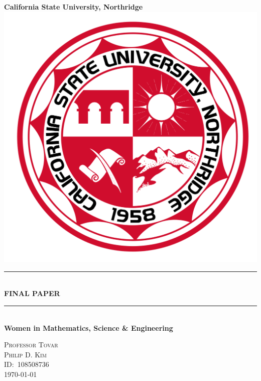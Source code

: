 \begin{titlepage}
  \newcommand{\HRule}{\rule{\linewidth}{0.5mm}}
  \center\Huge\textbf{California State University, Northridge}\\[2cm]
  \includegraphics[scale=0.1]{CSUNS.svg.png}\\[1cm]
  \HRule\  \\[0.4cm]
  {\huge\bfseries FINAL PAPER}\\
  \HRule\  \\[0.4cm]
  \Large\textbf{Women in Mathematics, Science \& Engineering}\\[0.5cm]
  \vfill
  \begin{minipage}{0.4\textwidth}
  \large\centering\textsc{Professor Tovar}\\
  \textsc{Philip D. Kim}\\
  \textsc{ID:\ 108508736}\\
  \textsc{\today}
  \end{minipage}
\end{titlepage}